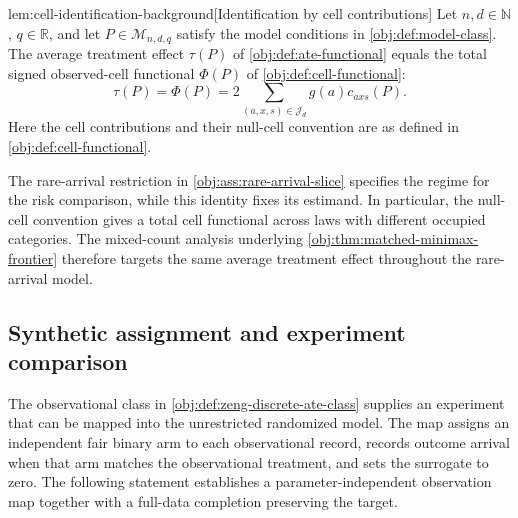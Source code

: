 \begin{lemmav}{lem:cell-identification-background}[Identification by cell contributions]
Let \(n,d\in\mathbb N\), \(q\in\mathbb R\), and let \(P\in\mathcal M_{n,d,q}\) satisfy the model conditions in \cref{obj:def:model-class}. The average treatment effect \(\tau(P)\) of \cref{obj:def:ate-functional} equals the total signed observed-cell functional \(\Phi(P)\) of \cref{obj:def:cell-functional}:
\[
\tau(P)=\Phi(P)
=2\sum_{(a,x,s)\in\mathcal J_d}g(a)c_{axs}(P).
\]
Here the cell contributions and their null-cell convention are as defined in \cref{obj:def:cell-functional}.
\end{lemmav}

The rare-arrival restriction in \cref{obj:ass:rare-arrival-slice} specifies the regime for the risk comparison, while this identity fixes its estimand. In particular, the null-cell convention gives a total cell functional across laws with different occupied categories. The mixed-count analysis underlying \cref{obj:thm:matched-minimax-frontier} therefore targets the same average treatment effect throughout the rare-arrival model.

\subsection{Synthetic assignment and experiment comparison}

The observational class in \cref{obj:def:zeng-discrete-ate-class} supplies an experiment that can be mapped into the unrestricted randomized model. The map assigns an independent fair binary arm to each observational record, records outcome arrival when that arm matches the observational treatment, and sets the surrogate to zero. The following statement establishes a parameter-independent observation map together with a full-data completion preserving the target.

